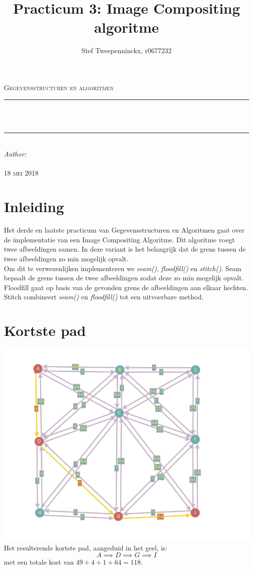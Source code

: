 \documentclass[11pt, a4paper]{article}
\author{Stef Tweepenninckx, r0677232}
\title{Practicum 3: Image Compositing algoritme}
\makeatletter
\def\printtitle{                 
    {\large \@title}}
\def\printauthor{                  
    {\large \@author}}
\makeatother
\begin{document}
\begin{titlepage}
\newcommand{\HRule}{\rule{\linewidth}{0.5mm}} 
\center 
\textsc{\LARGE Gegevensstructuren en algoritmen}\\[1.5cm] 
\HRule \\[0.4cm]

{\huge \bfseries \printtitle}\\[0.4cm] 
\HRule \\[0.4cm]

\Large \emph{Author:}\\
 \textsc{\printauthor}\\[3cm]

{\large \textsc{18 mei 2018}}\\[3cm] 

\vfill 
\end{titlepage}

\section*{Inleiding}
Het derde en laatste practicum van Gegevensstructuren en Algoritmen gaat over de implementatie van een Image Compositing Algoritme. Dit algoritme voegt twee afbeeldingen samen. In deze variant is het belangrijk dat de grens tussen de twee afbeeldingen zo min mogelijk opvalt.\\
Om dit te verwezenlijken implementeren we \emph{seam()}, \emph{floodfill()} en \emph{stitch()}. Seam bepaalt de grens tussen de twee afbeeldingen zodat deze zo min mogelijk opvalt. Floodfill gaat op basis van de gevonden grens de afbeeldingen aan elkaar hechten. Stitch combineert \emph{seam()} en \emph{floodfill()} tot een uitvoerbare method.

\newpage
\section*{Kortste pad}
\includegraphics[width=\textwidth]{grafe}
\vspace*{10px}
Het resulterende kortste pad, aangeduid in het geel, is: $$A \implies D \implies G \implies I$$ met een totale kost van $49 + 4 + 1 + 64 = 118$.
\end{document}
